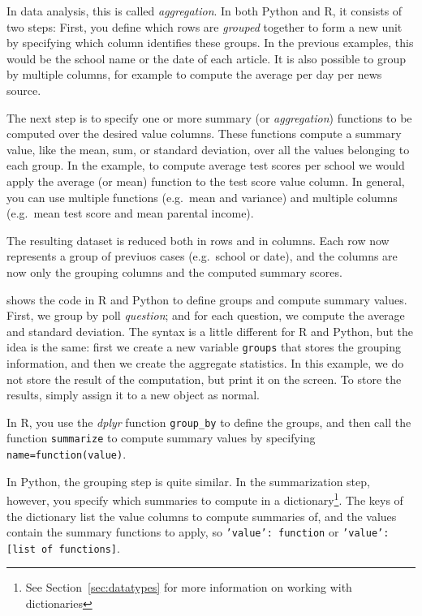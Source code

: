 In data analysis, this is called \emph{aggregation}.
In both Python and R, it consists of two steps:
First, you define which rows are \emph{grouped} together to form a new unit
by specifying which column identifies these groups.
In the previous examples, this would be the school name or the date of each article.
It is also possible to group by multiple columns, for example to compute the average per day per news source.

The next step is to specify one or more summary (or \emph{aggregation}) functions to be computed over the desired value columns.
These functions compute a summary value, like the mean, sum, or standard deviation, over all the values belonging to each group.
In the example, to compute average test scores per school we would apply the average (or mean) function to the test score value column.
In general, you can use multiple functions (e.g.\  mean and variance) and multiple columns (e.g.\ mean test score and mean parental income).

The resulting dataset is reduced both in rows and in columns.
Each row now represents a group of previuos cases (e.g.\ school or date),
and the columns are now only the grouping columns and the computed summary scores.

 shows the code in R and Python to define groups and compute summary values.
First, we group by poll \emph{question}; and for each question, we compute the average and standard deviation.
The syntax is a little different for R and Python, but the idea is the same:
first we create a new variable \verb+groups+ that stores the grouping information,
and then we create the aggregate statistics.
In this example, we do not store the result of the computation, but print it on the screen.
To store the results, simply assign it to a new object as normal.


In R, you use the \emph{dplyr} function \texttt{group\_by}  to define the groups,
and then call the function \texttt{summarize} to compute summary values by specifying
\verb+name=function(value)+.

In Python, the grouping step is quite similar.
In the summarization step, however, you specify which summaries to compute in a dictionary\footnote{See Section~\ref{sec:datatypes} for more information on working with dictionaries}.
The keys of the dictionary list the value columns to compute summaries of,
and the values contain the summary functions to apply, so  \texttt{'value': function} or \texttt{'value': [list of functions]}.

